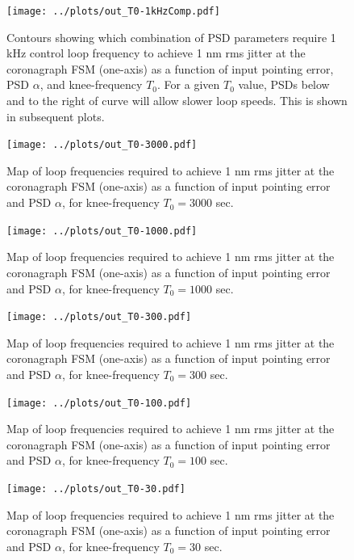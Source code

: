 \documentclass[10pt,preprint]{aastex631}
\begin{document}
\begin{figure}
\centering
\texttt{[image: ../plots/out\_T0-1kHzComp.pdf]}
\caption{Contours showing which combination of PSD parameters require 1 kHz control loop frequency to achieve 1 nm rms jitter at the coronagraph FSM (one-axis) as a function of input pointing error, PSD $\alpha$, and knee-frequency $T_0$. For a given $T_0$ value, PSDs below and to the right of curve will allow slower loop speeds.  This is shown in subsequent plots.  \label{fig:T0-1kHzComp}}
\end{figure}

\begin{figure}
\centering
\texttt{[image: ../plots/out\_T0-3000.pdf]}
\caption{Map of loop frequencies required to achieve 1 nm rms jitter at the coronagraph FSM (one-axis) as a function of input pointing error and PSD $\alpha$, for knee-frequency $T_0 = 3000$ sec.  \label{fig:T0-3000}}
\end{figure}

\begin{figure}
\centering
\texttt{[image: ../plots/out\_T0-1000.pdf]}
\caption{Map of loop frequencies required to achieve 1 nm rms jitter at the coronagraph FSM (one-axis) as a function of input pointing error and PSD $\alpha$, for knee-frequency $T_0 = 1000$ sec.  \label{fig:T0-1000}}
\end{figure}

\begin{figure}
\centering
\texttt{[image: ../plots/out\_T0-300.pdf]}
\caption{Map of loop frequencies required to achieve 1 nm rms jitter at the coronagraph FSM (one-axis) as a function of input pointing error and PSD $\alpha$, for knee-frequency $T_0 = 300$ sec.  \label{fig:T0-300}}
\end{figure}

\begin{figure}
\centering
\texttt{[image: ../plots/out\_T0-100.pdf]}
\caption{Map of loop frequencies required to achieve 1 nm rms jitter at the coronagraph FSM (one-axis) as a function of input pointing error and PSD $\alpha$, for knee-frequency $T_0 = 100$ sec.  \label{fig:T0-100}}
\end{figure}

\begin{figure}
\centering
\texttt{[image: ../plots/out\_T0-30.pdf]}
\caption{Map of loop frequencies required to achieve 1 nm rms jitter at the coronagraph FSM (one-axis) as a function of input pointing error and PSD $\alpha$, for knee-frequency $T_0 = 30$ sec.  \label{fig:T0-30}}
\end{figure}
\end{document}
